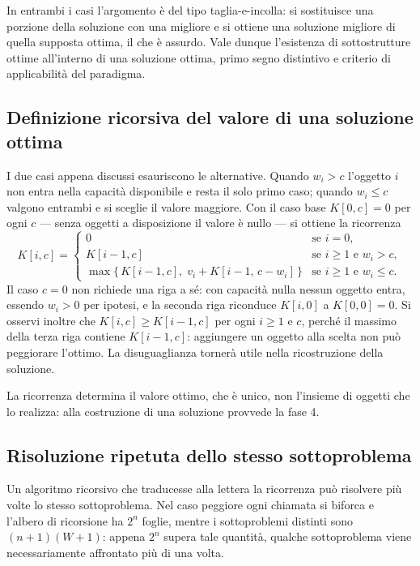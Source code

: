 \documentclass[11pt]{article}
\begin{document}
In entrambi i casi l'argomento \`e del tipo taglia-e-incolla: si sostituisce una
porzione della soluzione con una migliore e si ottiene una soluzione migliore di
quella supposta ottima, il che \`e assurdo. Vale dunque l'esistenza di
sottostrutture ottime all'interno di una soluzione ottima, primo segno
distintivo e criterio di applicabilit\`a del paradigma.

\subsection{Definizione ricorsiva del valore di una soluzione ottima}
I due casi appena discussi esauriscono le alternative. Quando $w_i > c$
l'oggetto $i$ non entra nella capacit\`a disponibile e resta il solo primo caso;
quando $w_i \le c$ valgono entrambi e si sceglie il valore maggiore. Con il caso
base $K[0,c] = 0$ per ogni $c$ --- senza oggetti a disposizione il valore \`e
nullo --- si ottiene la ricorrenza
\[
  K[i,c] =
  \begin{cases}
    0 & \text{se } i = 0, \\[2pt]
    K[i-1,c] & \text{se } i \ge 1 \text{ e } w_i > c, \\[2pt]
    \max\bigl\{\, K[i-1,c],\; v_i + K[i-1,\,c-w_i] \,\bigr\}
      & \text{se } i \ge 1 \text{ e } w_i \le c .
  \end{cases}
\]
Il caso $c = 0$ non richiede una riga a s\'e: con capacit\`a nulla nessun oggetto
entra, essendo $w_i > 0$ per ipotesi, e la seconda riga riconduce $K[i,0]$ a
$K[0,0] = 0$. Si osservi inoltre che $K[i,c] \ge K[i-1,c]$ per ogni $i \ge 1$ e $c$,
perch\'e il massimo della terza riga contiene $K[i-1,c]$: aggiungere un oggetto
alla scelta non pu\`o peggiorare l'ottimo. La disuguaglianza torner\`a utile
nella ricostruzione della soluzione.

La ricorrenza determina il valore ottimo, che \`e unico, non l'insieme di
oggetti che lo realizza: alla costruzione di una soluzione provvede la fase 4.

\subsection{Risoluzione ripetuta dello stesso sottoproblema}\label{sub:sovrapposizione}
Un algoritmo ricorsivo che traducesse alla lettera la ricorrenza pu\`o
risolvere pi\`u volte lo stesso sottoproblema. Nel caso peggiore ogni chiamata si biforca
e l'albero di ricorsione ha $2^n$ foglie, mentre i sottoproblemi distinti sono
$(n+1)(W+1)$: appena $2^n$ supera tale quantit\`a, qualche sottoproblema viene
necessariamente affrontato pi\`u di una volta.
\end{document}
